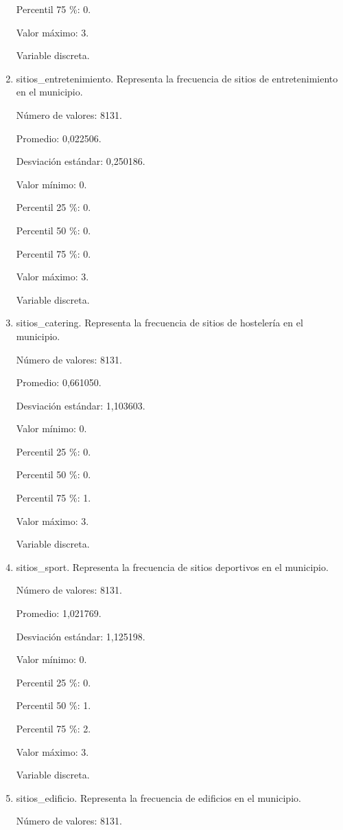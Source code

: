 \begin{enumerate}
	Percentil 75 \%: 0.
	
	Valor máximo: 3.
	
	Variable discreta.

	\item sitios\_entretenimiento. Representa la frecuencia de sitios de entretenimiento en el municipio.
	
	Número de valores: 8131.
	
	Promedio: 0,022506.
	
	Desviación estándar: 0,250186.
	
	Valor mínimo: 0.
	
	Percentil 25 \%: 0.
	
	Percentil 50 \%: 0.
	
	Percentil 75 \%: 0.
	
	Valor máximo: 3.
	
	Variable discreta.

	\item sitios\_catering. Representa la frecuencia de sitios de hostelería en el municipio.
	
	Número de valores: 8131.
	
	Promedio: 0,661050.
	
	Desviación estándar: 1,103603.
	
	Valor mínimo: 0.
	
	Percentil 25 \%: 0.
	
	Percentil 50 \%: 0.
	
	Percentil 75 \%: 1.
	
	Valor máximo: 3.
	
	Variable discreta.

	\item sitios\_sport. Representa la frecuencia de sitios deportivos en el municipio.
	
	Número de valores: 8131.
	
	Promedio: 1,021769.
	
	Desviación estándar: 1,125198.
	
	Valor mínimo: 0.
	
	Percentil 25 \%: 0.
	
	Percentil 50 \%: 1.
	
	Percentil 75 \%: 2.
	
	Valor máximo: 3.
	
	Variable discreta.

	\item sitios\_edificio. Representa la frecuencia de edificios en el municipio.
	
	Número de valores: 8131.
	

\end{enumerate}
